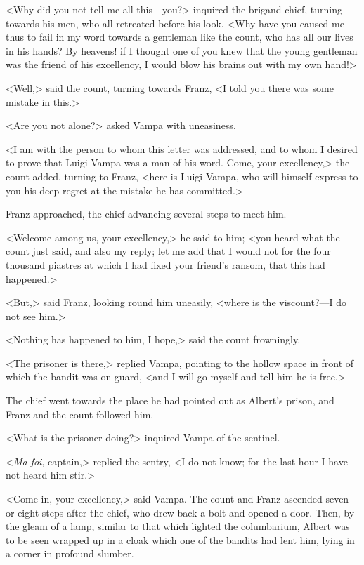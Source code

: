  <Why did you not tell me all this—you?> inquired the brigand chief, turning towards his men, who all retreated before his look. <Why have you caused me thus to fail in my word towards a gentleman like the count, who has all our lives in his hands? By heavens! if I thought one of you knew that the young gentleman was the friend of his excellency, I would blow his brains out with my own hand!>

<Well,> said the count, turning towards Franz, <I told you there was some mistake in this.> 

 <Are you not alone?> asked Vampa with uneasiness. 

 <I am with the person to whom this letter was addressed, and to whom I desired to prove that Luigi Vampa was a man of his word. Come, your excellency,> the count added, turning to Franz, <here is Luigi Vampa, who will himself express to you his deep regret at the mistake he has committed.> 

 Franz approached, the chief advancing several steps to meet him. 

 <Welcome among us, your excellency,> he said to him; <you heard what the count just said, and also my reply; let me add that I would not for the four thousand piastres at which I had fixed your friend's ransom, that this had happened.> 

 <But,> said Franz, looking round him uneasily, <where is the viscount?—I do not see him.> 

 <Nothing has happened to him, I hope,> said the count frowningly. 

 <The prisoner is there,> replied Vampa, pointing to the hollow space in front of which the bandit was on guard, <and I will go myself and tell him he is free.> 

 The chief went towards the place he had pointed out as Albert's prison, and Franz and the count followed him. 

 <What is the prisoner doing?> inquired Vampa of the sentinel. 

 <\textit{Ma foi}, captain,> replied the sentry, <I do not know; for the last hour I have not heard him stir.> 

 <Come in, your excellency,> said Vampa. The count and Franz ascended seven or eight steps after the chief, who drew back a bolt and opened a door. Then, by the gleam of a lamp, similar to that which lighted the columbarium, Albert was to be seen wrapped up in a cloak which one of the bandits had lent him, lying in a corner in profound slumber. 

